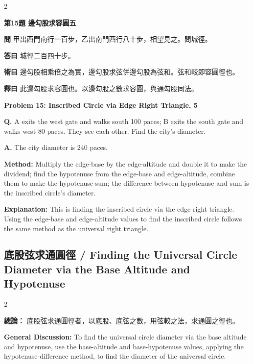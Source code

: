 \documentclass[11pt,a4paper]{article}
\newcommand{\wen}[1]{\noindent\textbf{問} #1\par\smallskip}
\newcommand{\da}[1]{\noindent\textbf{答曰} #1\par\smallskip}
\newcommand{\shu}[1]{\noindent\textbf{術曰} #1\par\smallskip}
\newcommand{\shi}[1]{\noindent\textbf{釋曰} #1\par\smallskip}
\newcommand{\wenE}[1]{\noindent\textbf{Q.} #1\par\smallskip}
\newcommand{\daE}[1]{\noindent\textbf{A.} #1\par\smallskip}
\newcommand{\shuE}[1]{\noindent\textbf{Method:} #1\par\smallskip}
\newcommand{\shiE}[1]{\noindent\textbf{Explanation:} #1\par\smallskip}
\begin{document}
\bigskip

\begin{paracol}{2}

\noindent\textbf{第15題 邊勾股求容圓五}

\wen{甲出西門南行一百步，乙出南門西行八十步，相望見之。問城徑。}
\da{城徑二百四十步。}
\shu{邊勾股相乘倍之為實，邊勾股求弦併邊勾股為弦和。弦和較即容圓徑也。}
\shi{此邊勾股求容圓也。以邊勾股之數求容圓，與通勾股同法。}

\switchcolumn

\noindent\textbf{Problem 15: Inscribed Circle via Edge Right Triangle, 5}

\wenE{A exits the west gate and walks south 100 paces; B exits the south gate and walks west 80 paces. They see each other. Find the city's diameter.}
\daE{The city diameter is 240 paces.}
\shuE{Multiply the edge-base by the edge-altitude and double it to make the dividend; find the hypotenuse from the edge-base and edge-altitude, combine them to make the hypotenuse-sum; the difference between hypotenuse and sum is the inscribed circle's diameter.}
\shiE{This is finding the inscribed circle via the edge right triangle. Using the edge-base and edge-altitude values to find the inscribed circle follows the same method as the universal right triangle.}

\end{paracol}

\clearpage

\subsection*{底股弦求通圓徑 / Finding the Universal Circle Diameter via the Base Altitude and Hypotenuse}

\begin{paracol}{2}

\noindent\textbf{總論：} 底股弦求通圓徑者，以底股、底弦之數，用弦較之法，求通圓之徑也。

\switchcolumn

\noindent\textbf{General Discussion:} To find the universal circle diameter via the base altitude and hypotenuse, use the base-altitude and base-hypotenuse values, applying the hypotenuse-difference method, to find the diameter of the universal circle.

\end{paracol}
\end{document}
